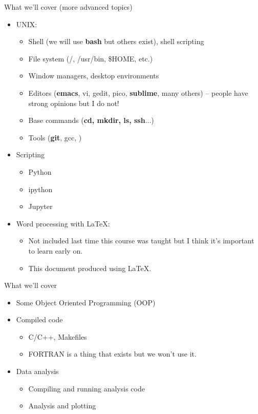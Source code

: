 \documentclass[10pt]{beamer}
\begin{document}
\begin{frame}[fragile]{What we'll cover (more advanced topics)}

    \begin{itemize}
    	\item UNIX:
    	\begin{itemize}
    		\item Shell (we will use \textbf{bash} but others exist), shell scripting
    		\item File system (/, /usr/bin, \$HOME, etc.)
    		\item Window managers, desktop environments
    		\item Editors (\textbf{emacs}, vi, gedit, pico, \textbf{sublime}, many others) -- people have strong opinions but I do not!
    		\item Base commands (\textbf{cd, mkdir, ls, ssh}...)
		\item Tools (\textbf{git}, gcc, )
    	\end{itemize}
    	\item Scripting
    	\begin{itemize}
    		\item Python
    		\item ipython
    		\item Jupyter
    	\end{itemize}
	\item Word processing with \LaTeX:
	\begin{itemize}
		\item Not included last time this course was taught but I think it's important to learn early on.
		\item This document produced using \LaTeX.
	\end{itemize}
	
	 \end{itemize}
\end{frame}	

\begin{frame}[fragile]{What we'll cover}
    \begin{itemize}	
    	\item Some Object Oriented Programming (OOP)
    	\item Compiled code
    	\begin{itemize}
    		\item C/C++, Makefiles
    		\item FORTRAN is a thing that exists but we won't use it.
    	\end{itemize}		
    	
    	\item Data analysis
	\begin{itemize}
		\item Compiling and running analysis code
    		\item Analysis and plotting
    	\end{itemize}		
    
    \end{itemize}

\end{frame}
\end{document}
